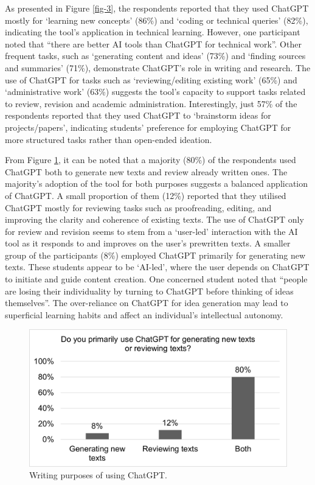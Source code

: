 \documentclass[english]{textolivre}
\begin{document}
As presented in Figure \ref{fig-3}, the respondents reported that they used ChatGPT mostly for ‘learning new concepts’ (86\%) and ‘coding or technical queries’ (82\%), indicating the tool’s application in technical learning. However, one participant noted that “there are better AI tools than ChatGPT for technical work”. Other frequent tasks, such as ‘generating content and ideas’ (73\%) and ‘finding sources and summaries’ (71\%), demonstrate ChatGPT’s role in writing and research. The use of ChatGPT for tasks such as ‘reviewing/editing existing work’ (65\%) and ‘administrative work’ (63\%) suggests the tool’s capacity to support tasks related to review, revision and academic administration. Interestingly, just 57\% of the respondents reported that they used ChatGPT to ‘brainstorm ideas for projects/papers’, indicating students’ preference for employing ChatGPT for more structured tasks rather than open-ended ideation.

\newpage
From Figure \ref{fig-4}, it can be noted that a majority (80\%) of the respondents used ChatGPT both to generate new texts and review already written ones. The majority’s adoption of the tool for both purposes suggests a balanced application of ChatGPT. A small proportion of them (12\%) reported that they utilised ChatGPT mostly for reviewing tasks such as proofreading, editing, and improving the clarity and coherence of existing texts. The use of ChatGPT only for review and revision seems to stem from a ‘user-led’ interaction with the AI tool as it responds to and improves on the user’s prewritten texts. A smaller group of the participants (8\%) employed ChatGPT primarily for generating new texts. These students appear to be ‘AI-led’, where the user depends on ChatGPT to initiate and guide content creation. One concerned student noted that “people are losing their individuality by turning to ChatGPT before thinking of ideas themselves”. The over-reliance on ChatGPT for idea generation may lead to superficial learning habits and affect an individual’s intellectual autonomy.

\begin{figure}[h!]
    \centering
    \begin{minipage}{0.80\linewidth}
    \includegraphics[width=\linewidth]{Imagens/FIGURA4.png}
    \caption{Writing purposes of using ChatGPT.}
    \label{fig-4}
    \end{minipage}
\end{figure}
\end{document}
